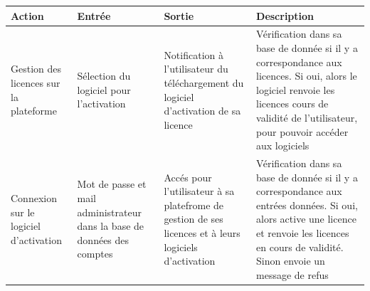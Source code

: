 \begin{table}[!ht] %
	\small
	\begin{tabular}{ | m{3cm} | m{3cm} | m{3cm} | m{6cm} | } 
		\hline
		\textbf{Action} & \textbf{Entrée} & \textbf{Sortie} & \textbf{Description} \\
		\hline
			Gestion des licences sur la plateforme & Sélection du logiciel pour l'activation & Notification à l'utilisateur du téléchargement du logiciel d'activation de sa licence & Vérification dans sa base de donnée si il y a correspondance aux licences. Si oui, alors le logiciel renvoie les licences cours de validité de l'utilisateur, pour pouvoir accéder aux logiciels \\ 
		\hline
			Connexion sur \newline le logiciel \newline d'activation &  Mot de passe et mail administrateur dans la base de données des comptes & Accés pour l'utilisateur à sa platefrome de gestion de ses licences et à leurs logiciels d'activation & Vérification dans sa base de donnée si il y a correspondance aux entrées données. Si oui, alors active une licence et renvoie les licences en cours de validité. Sinon envoie un message de refus \\ 
		\hline
	\end{tabular}
\end{table}
